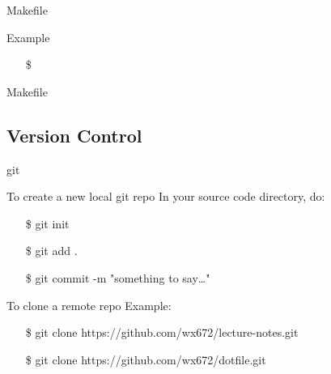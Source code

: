 \begin{frame}{Makefile}
  \begin{iblock}{}
  \end{iblock}
  \begin{iblock}{Example}
  \end{iblock}
  \begin{itemize}
  \item[\$] 
  \end{itemize}
\end{frame}

\begin{frame}{Makefile}
  \begin{minipage}{.75\linewidth}
  \end{minipage}
  \begin{minipage}{.2\linewidth}
    \begin{center}
    \end{center}
  \end{minipage}
\end{frame}

\subsection{Version Control}
\label{sec:version-control}

\begin{frame}{git}
  \begin{block}{To create a new local git repo}
    In your source code directory, do:\ttfamily
    \begin{itemize}
    \item[\$] git init
    \item[\$] git add .
    \item[\$] git commit -m "something to say\ldots"
    \end{itemize}
  \end{block}
  \begin{block}{To clone a remote repo}
    Example:\ttfamily
    \begin{itemize}
    \item[\$] git clone https://github.com/wx672/lecture-notes.git
    \item[\$] git clone https://github.com/wx672/dotfile.git
    \end{itemize}
  \end{block}
\end{frame}

